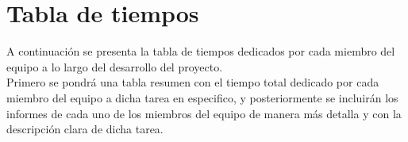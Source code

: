 \documentclass[12pt]{article} %
\begin{document}
\section{Tabla de tiempos}
A continuación se presenta la tabla de tiempos dedicados por cada miembro del equipo a lo largo del desarrollo del proyecto.\\

Primero se pondrá una tabla resumen con el tiempo total dedicado por cada miembro del equipo a dicha tarea en especifico, y posteriormente se incluirán los informes de cada uno de los miembros del equipo de manera más detalla y con la descripción clara de dicha tarea.\\

  

  



\newpage
{} 
\printbibliography
\end{document}
